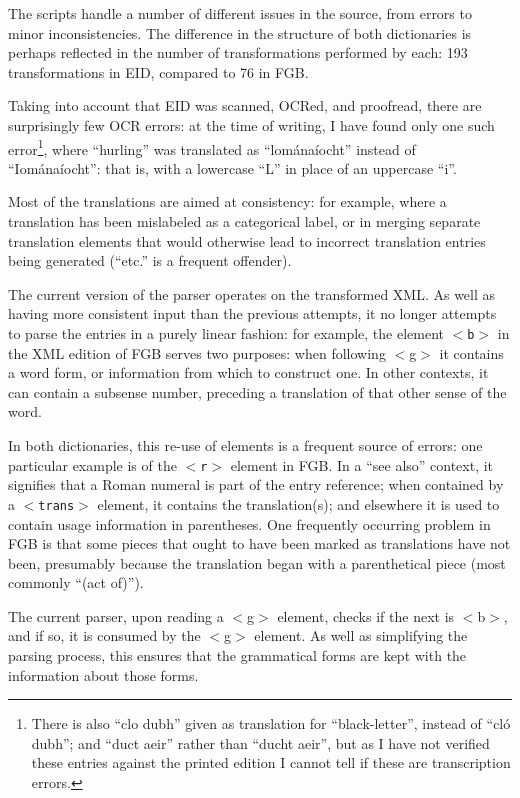 The scripts handle a number of different issues in the source, from errors to minor 
inconsistencies. The difference in the structure of both dictionaries is perhaps 
reflected in the number of transformations performed by each: 193 transformations 
in EID, compared to 76 in FGB.

Taking into account that EID was scanned, OCRed, and proofread, there are surprisingly 
few OCR errors: at the time of writing, I have found only one such error\footnote{There 
is also ``clo dubh'' given as translation for ``black-letter'', instead of ``cl\'o dubh''; 
and ``duct aeir'' rather than ``ducht aeir'', but as I have not verified these entries 
against the printed edition I cannot tell if these are transcription errors.}, where 
``hurling'' was translated as ``lom\'ana\'iocht'' instead of ``Iom\'ana\'iocht'': that 
is, with a lowercase ``L'' in place of an uppercase ``i''. 

Most of the translations are aimed at consistency: for example, where a translation has
 been mislabeled as a categorical label, or in merging separate translation elements that 
would otherwise lead to incorrect translation entries being generated (``etc.'' is a 
frequent offender).

The current version of the parser operates on the transformed XML. As well as having 
more consistent input than the previous attempts, it no longer attempts to parse the 
entries in a purely linear fashion: for example, the element \texttt{$<$b$>$} in the 
XML edition of FGB serves two purposes: when following $<$g$>$ it contains a word form, 
or information from which to construct one.
In other contexts, it can contain a subsense number, preceding a 
translation of that other sense of the word.

In both dictionaries, this re-use of elements is a frequent source of errors: one 
particular example is of the \texttt{$<$r$>$} element in FGB. In a ``see also'' context,
it signifies that a Roman numeral is part of the entry reference; when contained by a
\texttt{$<$trans$>$} element, it contains the translation(s); and elsewhere it is used
to contain usage information in parentheses. One frequently occurring problem in FGB is that some
pieces that ought to have been marked as translations have not been, presumably because 
the translation began with a parenthetical piece (most commonly ``(act of)'').

The current parser, upon reading a $<$g$>$ element, checks if the next is $<$b$>$, and if so, 
it is consumed by the $<$g$>$ element. As well as simplifying the parsing process, this ensures 
that the grammatical forms are kept with the information about those forms.

